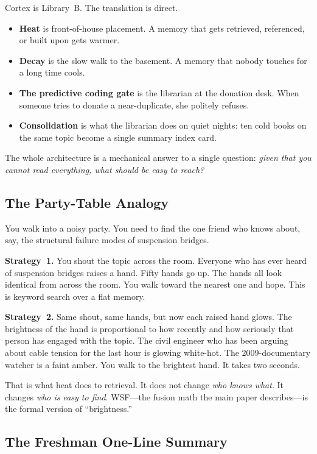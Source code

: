 \documentclass[11pt]{article}
\begin{document}
Cortex is Library~B.  The translation is direct.
\begin{itemize}
  \item \textbf{Heat} is front-of-house placement.  A memory that
        gets retrieved, referenced, or built upon gets warmer.
  \item \textbf{Decay} is the slow walk to the basement.  A memory
        that nobody touches for a long time cools.
  \item \textbf{The predictive coding gate} is the librarian at
        the donation desk.  When someone tries to donate a
        near-duplicate, she politely refuses.
  \item \textbf{Consolidation} is what the librarian does on quiet
        nights: ten cold books on the same topic become a single
        summary index card.
\end{itemize}

The whole architecture is a mechanical answer to a single question:
\emph{given that you cannot read everything, what should be easy to
reach?}

\subsection{The Party-Table Analogy}
\label{app:feynman-party}

You walk into a noisy party.  You need to find the one friend who
knows about, say, the structural failure modes of suspension
bridges.

\textbf{Strategy~1.} You shout the topic across the room.  Everyone
who has ever heard of suspension bridges raises a hand.  Fifty
hands go up.  The hands all look identical from across the room.
You walk toward the nearest one and hope.  This is keyword search
over a flat memory.

\textbf{Strategy~2.} Same shout, same hands, but now each raised
hand glows.  The brightness of the hand is proportional to how
recently and how seriously that person has engaged with the topic.
The civil engineer who has been arguing about cable tension for the
last hour is glowing white-hot.  The 2009-documentary watcher is a
faint amber.  You walk to the brightest hand.  It takes two
seconds.

That is what heat does to retrieval.  It does not change \emph{who
knows what}.  It changes \emph{who is easy to find}.  WSF---the
fusion math the main paper describes---is the formal version of
``brightness.''

\subsection{The Freshman One-Line Summary}
\label{app:feynman-oneline}
\end{document}
